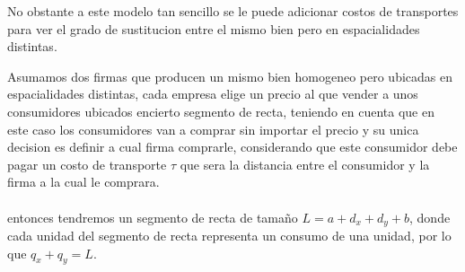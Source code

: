 \documentclass[11pt]{article}
\begin{document}
\begin{flushleft}
    \begin{center}
    \end{center}
        

    No obstante a este modelo tan sencillo se le puede adicionar costos de transportes para ver el grado de sustitucion entre el mismo bien pero en espacialidades distintas.

    \begin{example}
        Asumamos dos firmas que producen un mismo bien homogeneo pero ubicadas en espacialidades distintas, cada empresa elige un precio al que vender a unos consumidores ubicados encierto segmento de recta, teniendo en cuenta que en este caso los consumidores van a comprar sin importar el precio y su unica decision es definir a cual firma comprarle, considerando que este consumidor debe pagar un costo de transporte $\tau$ que sera la distancia entre el consumidor y la firma a la cual le comprara.\\~\\
        
        entonces tendremos un segmento de recta de tamaño $L=a+d_x+d_y+b$, donde cada unidad del segmento de recta representa un consumo de una unidad, por lo que $q_x+q_y=L$.
        
        \begin{center}
            \begin{tikzpicture}[x=0.75pt,y=0.75pt,yscale=-1,xscale=1]
                

\end{tikzpicture}
\end{center}
\end{example}
\end{flushleft}
\end{document}
